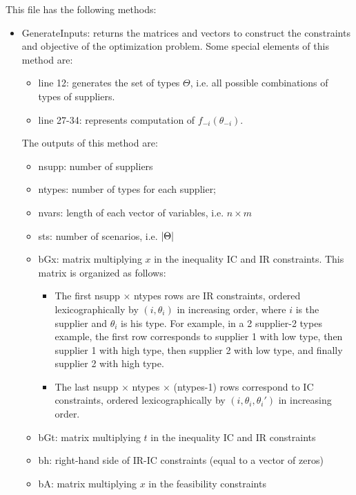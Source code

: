 \documentclass[11pt, oneside]{article}
\begin{document}
This file has the following methods:
\begin{itemize}
    \item GenerateInputs: returns the matrices and vectors to construct the
    constraints and objective of the optimization problem. Some special elements
    of this method are:
    \begin{itemize}
        \item line 12: generates the set of types \(\Theta\), i.e. all possible
        combinations of types of suppliers.
        \item line 27-34: represents computation of \(f_{-i}(\theta_{-i})\).
    \end{itemize}
    The outputs of this method are:
    \begin{itemize}
        \item nsupp: number of suppliers
        \item ntypes: number of types for each supplier;
        \item nvars: length of each vector of variables, i.e. \(n\times m\)
        \item sts: number of scenarios, i.e. \(\left|\Theta\right|\)
        \item bGx: matrix multiplying \(x\) in the inequality IC and IR constraints.
        This matrix is organized as follows:
        \begin{itemize}
            \item The first nsupp \(\times\) ntypes rows are IR constraints, ordered
            lexicographically by \((i, \theta_i)\) in increasing order, where \(i\) is the supplier
            and \(\theta_i\) is his type. For example, in a 2 supplier-2 types
            example, the first row corresponds to supplier 1 with low type, then
            supplier 1 with high type, then supplier 2 with low type, and
            finally supplier 2 with high type.
            \item The last nsupp \(\times\) ntypes \(\times\) (ntypes-1) rows correspond
            to IC constraints, ordered lexicographically by \((i, \theta_i, \theta_i')\) in
            increasing order.
        \end{itemize}
        \item bGt: matrix multiplying \(t\) in the inequality IC and IR constraints
        \item bh: right-hand side of IR-IC constraints (equal to a vector of zeros)
        \item bA: matrix multiplying \(x\) in the feasibility constraints

\end{itemize}
\end{itemize}
\end{document}
